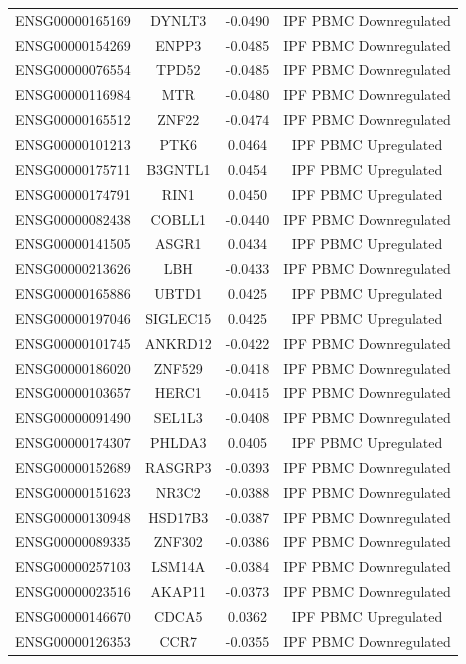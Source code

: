 \documentclass[
]{article}
\begin{document}
\begin{singlespace}
\begin{longtable}[t]{lccc}
ENSG00000165169 & DYNLT3 & -0.0490 & IPF PBMC Downregulated\\
ENSG00000154269 & ENPP3 & -0.0485 & IPF PBMC Downregulated\\
ENSG00000076554 & TPD52 & -0.0485 & IPF PBMC Downregulated\\
ENSG00000116984 & MTR & -0.0480 & IPF PBMC Downregulated\\
\addlinespace
ENSG00000165512 & ZNF22 & -0.0474 & IPF PBMC Downregulated\\
ENSG00000101213 & PTK6 & 0.0464 & IPF PBMC Upregulated\\
ENSG00000175711 & B3GNTL1 & 0.0454 & IPF PBMC Upregulated\\
ENSG00000174791 & RIN1 & 0.0450 & IPF PBMC Upregulated\\
ENSG00000082438 & COBLL1 & -0.0440 & IPF PBMC Downregulated\\
\addlinespace
ENSG00000141505 & ASGR1 & 0.0434 & IPF PBMC Upregulated\\
ENSG00000213626 & LBH & -0.0433 & IPF PBMC Downregulated\\
ENSG00000165886 & UBTD1 & 0.0425 & IPF PBMC Upregulated\\
ENSG00000197046 & SIGLEC15 & 0.0425 & IPF PBMC Upregulated\\
ENSG00000101745 & ANKRD12 & -0.0422 & IPF PBMC Downregulated\\
\addlinespace
ENSG00000186020 & ZNF529 & -0.0418 & IPF PBMC Downregulated\\
ENSG00000103657 & HERC1 & -0.0415 & IPF PBMC Downregulated\\
ENSG00000091490 & SEL1L3 & -0.0408 & IPF PBMC Downregulated\\
ENSG00000174307 & PHLDA3 & 0.0405 & IPF PBMC Upregulated\\
ENSG00000152689 & RASGRP3 & -0.0393 & IPF PBMC Downregulated\\
\addlinespace
ENSG00000151623 & NR3C2 & -0.0388 & IPF PBMC Downregulated\\
ENSG00000130948 & HSD17B3 & -0.0387 & IPF PBMC Downregulated\\
ENSG00000089335 & ZNF302 & -0.0386 & IPF PBMC Downregulated\\
ENSG00000257103 & LSM14A & -0.0384 & IPF PBMC Downregulated\\
ENSG00000023516 & AKAP11 & -0.0373 & IPF PBMC Downregulated\\
\addlinespace
ENSG00000146670 & CDCA5 & 0.0362 & IPF PBMC Upregulated\\
ENSG00000126353 & CCR7 & -0.0355 & IPF PBMC Downregulated\\

\end{longtable}
\end{singlespace}
\end{document}
